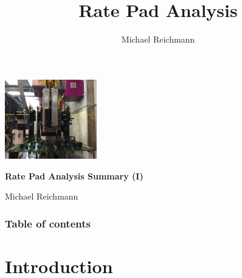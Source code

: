 \documentclass[9pt]{beamer}
\title[Analysis]{Rate Pad Analysis}
\author[M. Reichmann]{Michael Reichmann}
\institute[\textbf{\textit{ETH}}\scalebox{.6}{\textit{Z\"{u}rich}}]{Swiss Federal Institute of Technology Zurich}
\begin{document}
\begin{frame}
	\begin{center}
		\includegraphics[width=4cm]{telescope3}
	\end{center}
	\begin{alertblock}{
		\begin{center}
			\textbf{Rate Pad Analysis Summary (I)}
		\end{center}}
		\vspace*{10pt}
		\begin{center}\small
		Michael Reichmann
		\end{center}\normalsize
	\end{alertblock}
\end{frame}
\begin{frame}[allowframebreaks]
	\frametitle{Table of contents}
	\tableofcontents %
\end{frame}
\section{Introduction}
\end{document}
